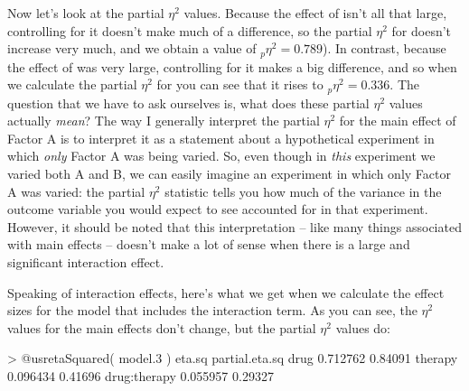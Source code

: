 Now let's look at the partial $\eta^2$ values. Because the effect of  isn't all that large, controlling for it doesn't make much of a difference, so the partial $\eta^2$ for  doesn't increase very much, and we obtain a value of $_p\eta^2 = 0.789$). In contrast, because the effect of  was very large, controlling for it makes a big difference, and so when we calculate the partial $\eta^2$ for  you can see that it rises to $_p\eta^2 = 0.336$. The question that we have to ask ourselves is, what does these partial $\eta^2$ values actually {\it mean}? The way I generally interpret the partial $\eta^2$ for the main effect of Factor A is to interpret it as a statement about a hypothetical experiment in which {\it only} Factor A was being varied. So, even though in {\it this} experiment we varied both A and B, we can easily imagine an experiment in which only Factor A was varied: the partial $\eta^2$ statistic tells you how much of the variance in the outcome variable you would expect to see accounted for in that experiment. However, it should be noted that this interpretation -- like many things associated with main effects -- doesn't make a lot of sense when there is a large and significant interaction effect. 

Speaking of interaction effects, here's what we get when we calculate the effect sizes for the model that includes the interaction term. As you can see, the $\eta^2$ values for the main effects don't change, but the partial $\eta^2$ values do:
\begin{rblock1}
> @usr{etaSquared( model.3 )}
               eta.sq partial.eta.sq
drug         0.712762        0.84091
therapy      0.096434        0.41696
drug:therapy 0.055957        0.29327
\end{rblock1}





